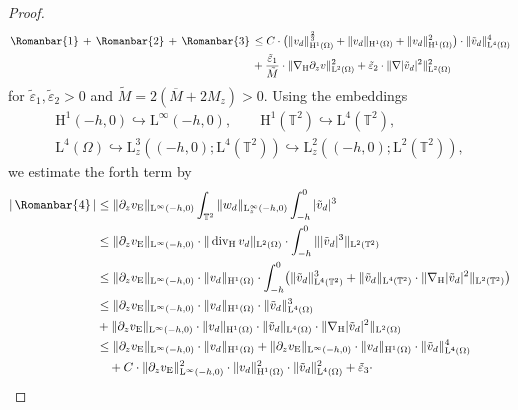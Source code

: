 \documentclass[preprint]{elsarticle}
\numberwithin{equation}{section}
\newcommand {\T}	{\mathbb{T}}
\DeclareMathOperator{\divH}{div_{\H}}
\renewcommand{\H}{\mathrm{H}}
\newcommand{\dk}[1]{\partial_{#1}}
\newcommand{\dz}{\dk{z}}
\renewcommand{\bar}[1]{\overline{#1}}
\newcommand{\vtilde}{\tilde{v}}
\newcommand{\nablaH}{\nabla_{\H}}
\newcommand{\rL}{\mathrm{L}}
\newcommand{\rH}{\H}
\newcommand{\rE}{\mathrm{E}}
\newcommand{\I}{\, \Romanbar{1} \, }
\newcommand{\II}{\, \Romanbar{2}\, }
\newcommand{\III}{\, \Romanbar{3}\, }
\newcommand{\IV}{\, \Romanbar{4}\, }
\begin{document}
\begin{proof}
\begin{align*}
		\I + \II + \III
		&\leq C \cdot  \bigl( \| v_d \|_{\rH^1(\Omega)}^{\frac{2}{3}} + \| v_d \|_{\rH^1(\Omega)}+\| v_d \|_{\rH^1(\Omega)}^2 \bigr) 
		\cdot \| \vtilde_d \|_{\rL^4(\Omega)}^4   \\
		&+ \frac{\tilde{\varepsilon}_1}{\tilde{M}} \cdot \| \nablaH \partial_z v \|_{\rL^2(\Omega)}^2 
		+ \tilde{\varepsilon}_2 \cdot \| \nabla |\vtilde_d|^2 \|_{\rL^2(\Omega)}^2
	\end{align*}
	for $\tilde{\varepsilon}_1,\tilde{\varepsilon}_2 > 0$ and $\tilde{M} = 2(\bar{M} + 2 M_z) > 0$.
	Using the embeddings
	\begin{align*}
		\rH^1(-h,0) \hookrightarrow \rL^\infty(-h,0), \qquad 
		\rH^1(\T^2) \hookrightarrow \rL^4(\T^2), \\
		\rL^4(\Omega) \hookrightarrow \rL^3_z((-h,0); \rL^4(\T^2)) \hookrightarrow  \rL^2_z((-h,0); \rL^2(\T^2)),
	\end{align*}
	we estimate the forth term by 
	\begin{align*}
		|\IV|
		&\leq \| \dz v_{\rE} \|_{\rL^\infty(-h,0)} \int_{\T^2} \| w_d \|_{\rL^\infty_z(-h,0)} \int_{-h}^0 |\vtilde_d|^3 
		\\
		&\leq \| \dz v_{\rE} \|_{\rL^\infty(-h,0)} \cdot \| \divH v_d \|_{\rL^2(\Omega)} \cdot  \int_{-h}^0 \| |\vtilde_d|^3 \|_{\rL^2(\T^2)} \\
		&\leq \| \dz v_{\rE} \|_{\rL^\infty(-h,0)} \cdot \| v_d \|_{\rH^1(\Omega)} \cdot \int_{-h}^0 \bigl( \| \vtilde_d \|_{\rL^4(\T^2)}^3 + \| \vtilde_d \|_{\rL^4(\T^2)} \cdot \| \nablaH |\vtilde_d|^2 \|_{\rL^2(\T^2)} \bigr) \\
		&\leq \| \dz v_{\rE} \|_{\rL^\infty(-h,0)} \cdot \| v_d \|_{\rH^1(\Omega)} \cdot \| \vtilde_d \|_{\rL^4(\Omega)}^3 \\ 
		&+ \| \dz v_{\rE} \|_{\rL^\infty(-h,0)} \cdot \| v_d \|_{\rH^1(\Omega)} \cdot \| \vtilde_d \|_{\rL^4(\Omega)} \cdot \| \nablaH |\vtilde_d|^2 \|_{\rL^2(\Omega)} \\
		&\leq
		\| \dz v_{\rE} \|_{\rL^\infty(-h,0)} \cdot \| v_d \|_{\rH^1(\Omega)}
		+ \| \dz v_{\rE} \|_{\rL^\infty(-h,0)} \cdot \| v_d \|_{\rH^1(\Omega)} \cdot \| \vtilde_d \|_{\rL^4(\Omega)}^4 \\
		&\hspace{10pt} + C \cdot \| \dz v_{\rE} \|_{\rL^\infty(-h,0)}^2 \cdot \| v_d \|_{\rH^1(\Omega)}^2 \cdot \| \vtilde_d \|_{\rL^4(\Omega)}^2 + \tilde{\varepsilon}_3 \cdot 

\end{align*}
\end{proof}
\end{document}
